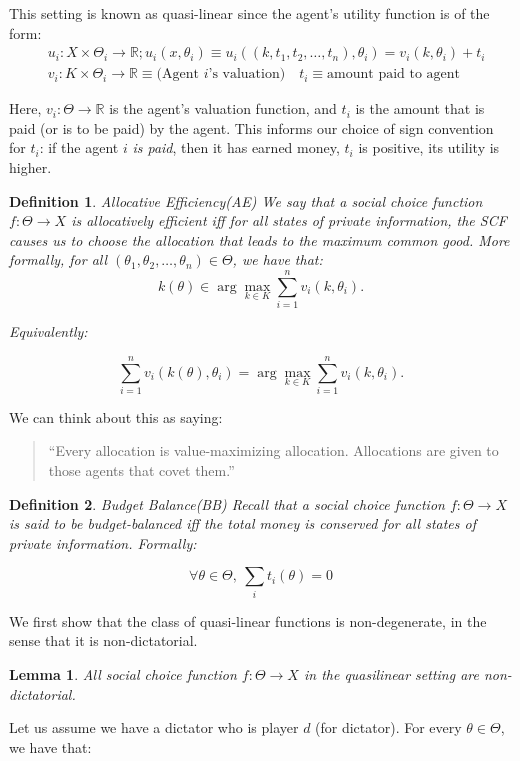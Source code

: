 \documentclass[10pt,a4paper]{article}
\newtheorem{lemma}{Lemma}
\newtheorem{definition}{Definition}
\newcommand{\R}{\ensuremath{\mathbb R}}
\begin{document}
This setting is known as quasi-linear since the agent's utility function
is of the form:
\begin{align*}
	&u_i: X \times \Theta_i \rightarrow \R; 
	u_i(x, \theta_i) \equiv u_i((k, t_1, t_2, \dots, t_n), \theta_i) = v_i(k, \theta_i) + t_i \\
	&v_i: K \times \Theta_i \rightarrow \R \equiv \text{(Agent $i$'s valuation)} \quad t_i \equiv \text{amount paid to agent} 
\end{align*}

Here, $v_i : \Theta \rightarrow \R$ is the agent's valuation function, and $t_i$
is the amount that is paid (or is to be paid) by the agent. This informs
our choice of sign convention for $t_i$: if the agent $i$ \emph{is paid}, then
it has earned money, $t_i$ is positive, its utility is higher. 

\begin{definition}{Allocative Efficiency(AE)}
We say that a social choice function $f: \Theta \rightarrow X$
is allocatively efficient iff for all states of private information,
the SCF causes us to choose the allocation that leads to the \emph{maximum common good}.
More formally,  for all $(\theta_1, \theta_2, \dots, \theta_n) \in \Theta$, we have that:
$$k(\theta) \in \arg \max_{k \in K} \sum_{i=1}^n v_i(k, \theta_i).$$

Equivalently:

$$
\sum_{i=1}^n v_i(k(\theta), \theta_i) = \arg \max_{k \in K} \sum_{i=1}^n v_i(k, \theta_i).
$$
\end{definition}


We can think about this as saying:
\begin{quote}
``Every allocation is value-maximizing allocation. Allocations are given to
those agents that covet them.''
\end{quote}

\begin{definition}{Budget Balance(BB)}
Recall that a social choice function $f: \Theta \rightarrow X$ is said to be
\emph{budget-balanced} iff the total money is conserved for all states
of private information. Formally:

$$\forall \theta \in \Theta, ~ \sum_i t_i(\theta) = 0$$
\end{definition}

We first show that the class of quasi-linear functions is non-degenerate,
in the sense that it is non-dictatorial.

\begin{lemma}
All social choice function $f: \Theta \rightarrow X$
in the quasilinear setting are non-dictatorial.
\end{lemma}
Let us assume we have a dictator who is player $d$ (for dictator).
For every $\theta \in \Theta$, we have that:
\end{document}
